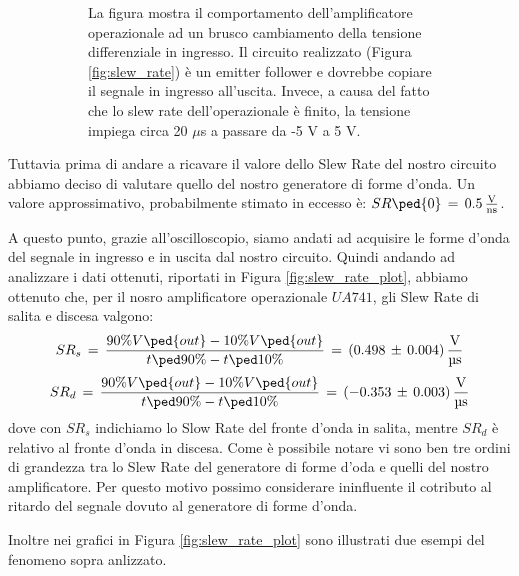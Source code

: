\begin{figure}[H]
\begin{subfigure}[]{0.45\textwidth}
        	\caption{La figura mostra il comportamento dell'amplificatore operazionale ad un brusco cambiamento della tensione differenziale in ingresso. Il circuito realizzato (Figura \ref{fig:slew_rate}) è un emitter follower e dovrebbe copiare il segnale in ingresso all'uscita. Invece, a causa del fatto che lo slew rate dell'operazionale è finito, la tensione impiega circa 20 $\mu$s a passare da -5 V a 5 V.}
	       	\label{fig:slew_rate_plot2}
	    \end{subfigure}
        \caption{}
        \label{slew_rate_plot}
\end{figure}

Tuttavia prima di andare a ricavare il valore dello Slew Rate del nostro circuito abbiamo deciso di valutare quello del nostro generatore di forme d'onda. Un valore approssimativo, probabilmente stimato in eccesso è: $SR\ped{0}\,=\,0.5\,\frac{\SI{}{\volt}}{\SI{}{\nano\second}}$.

A questo punto, grazie all'oscilloscopio, siamo andati ad acquisire le forme d'onda del segnale in ingresso e in uscita dal nostro circuito. Quindi andando ad analizzare i dati ottenuti, riportati in Figura \ref{fig:slew_rate_plot}, abbiamo ottenuto che, per il nosro amplificatore operazionale $UA741$, gli Slew Rate di salita e discesa  valgono:
\begin{equation}
	SR_s\,=\,\frac{90\%V\ped{out}-10\%V\ped{out}}{t\ped{90\%}-t\ped{10\%}}\,=\,(0.498\,\pm\,0.004)\,\frac{\SI{}{\volt}}{\SI{}{\micro\second}}
	\label{slew_rate_value_s}
\end{equation}
\begin{equation}
	SR_d\,=\,\frac{90\%V\ped{out}-10\%V\ped{out}}{t\ped{90\%}-t\ped{10\%}}\,=\,(-0.353\,\pm\,0.003)\,\frac{\SI{}{\volt}}{\SI{}{\micro\second}}
	\label{slew_rate_value_d}
\end{equation}
dove con $SR_s$ indichiamo lo Slow Rate del fronte d'onda in salita, mentre $SR_d$ è relativo al fronte d'onda in discesa.
Come è possibile notare vi sono ben tre ordini di grandezza tra lo Slew Rate del generatore di forme d'oda e quelli del nostro amplificatore. Per questo motivo possimo considerare ininfluente il cotributo al ritardo del segnale dovuto al generatore di forme d'onda.

Inoltre nei grafici in Figura \ref{fig:slew_rate_plot} sono illustrati due esempi del fenomeno sopra anlizzato.


